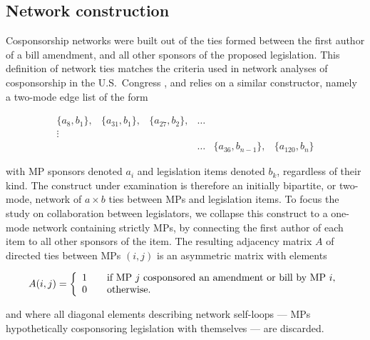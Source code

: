 \subsection{Network construction}

Cosponsorship networks were built out of the ties formed between the first author of a bill amendment, and all other sponsors of the proposed legislation. This definition of network ties matches the criteria used in network analyses of cosponsorship in the U.S.~Congress \citep{Fowler2006-PA,GrossShalizi2012}, and relies on a similar constructor, namely a two-mode edge list of the form%

 \[ \begin{array}{cccccc}
    	\{ a_8 , b_1 \} , & \{ a_{31}, b_1 \} , & \{ a_{27}, b_2 \} , & \dots & & \\
    	\vdots & & & & & \\
      & & & \dots & \{ a_{36}, b_{n-1} \} , & \{ a_{120}, b_n \}
    \end{array} \]

with MP sponsors denoted $a_i$ and legislation items denoted $b_k$, regardless of their kind. The construct under examination is therefore an initially bipartite, or two-mode, network of $a \times b$ ties between MPs and legislation items. To focus the study on collaboration between legislators, we collapse this construct to a one-mode network containing strictly MPs, by connecting the first author of each item to all other sponsors of the item. The resulting adjacency matrix $A$ of directed ties between MPs $(i,j)$ is an asymmetric matrix with elements%

    \[ A(i,j) = \left\{
      \begin{array}{l l}
        1 & \quad \text{if MP $j$ cosponsored an amendment or bill by MP $i$,}\\
        0 & \quad \text{otherwise.}
      \end{array} \right. \]

and where all diagonal elements describing network self-loops --- MPs hypothetically cosponsoring legislation with themselves --- are discarded.%

%

